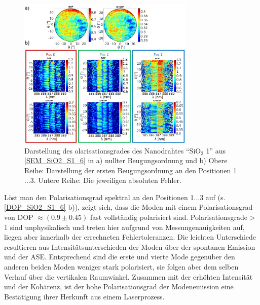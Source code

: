 \begin{figure}[b]
\includegraphics[width=0.75\textwidth]{Bilder/SiO2/DOP_SiO2_S1_6}
\caption{Darstellung des olarisationsgrades des Nanodrahtes ``SiO$_\text{2}$ 1'' aus \autoref{SEM_SiO2_S1_6} in a) nullter Beugungsordnung und b) Obere Reihe: Darstellung der ersten Beugungsordnung an den Positionen 1$\ldots$3. Untere Reihe: Die jeweiligen absoluten Fehler.}
\label{DOP_SiO2_S1_6}
\end{figure}Löst man den Polarisationsgrad spektral an den Positionen 1$\ldots$3 auf (s. \autoref{DOP_SiO2_S1_6} b)), zeigt sich, dass die Moden mit einem Polarisationsgrad von DOP $\approx (\text{0.9}\pm\text{0.45})$ fast vollständig polarisiert sind. Polarisationsgrade > 1 sind unphysikalisch und treten hier aufgrund von Messungenauigkeiten auf, liegen aber innerhalb der errechneten Fehlertoleranzen. Die leichten Unterschiede resultieren aus Intensitätsunterschieden der Moden über der spontanen Emission und der ASE. Entsprechend sind die erste und vierte Mode gegenüber den anderen beiden Moden weniger stark polarisiert, sie folgen aber dem selben Verlauf über die vertikalen Raumwinkel. Zusammen mit der erhöhten Intensität und der Kohärenz, ist der hohe Polarisationsgrad der Modenemission eine Bestätigung ihrer Herkunft aus einem Laserprozess.\\
